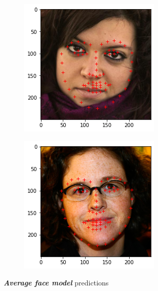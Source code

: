 \documentclass{article}
\begin{document}
\begin{figure}[h]
  \centering
  \begin{subfigure}[b]{0.35\textwidth}
    \includegraphics[width=\textwidth]{avg1}
  \end{subfigure}
  \begin{subfigure}[b]{.35\textwidth}
    \includegraphics[width=\textwidth]{avg5}
  \end{subfigure}
  \caption{\textbf{\textit{Average face model}} predictions}
  \label{fig:model-avg}
\end{figure}    
\end{document}
